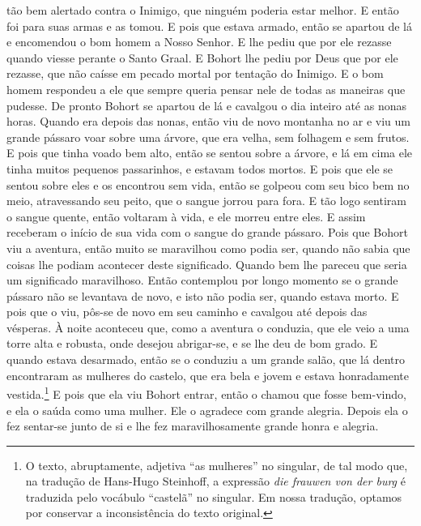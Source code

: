 tão bem alertado contra o Inimigo, que ninguém poderia estar melhor. E então
foi para suas armas e as tomou. E pois que estava armado, então se apartou de
lá e encomendou o bom homem a Nosso Senhor. E lhe pediu que por ele rezasse
quando viesse perante o Santo Graal. E Bohort lhe pediu por Deus que por ele
rezasse, que não caísse em pecado mortal por tentação do Inimigo. E o bom homem
respondeu a ele que sempre queria pensar nele de todas as maneiras que pudesse.
De pronto Bohort se apartou de lá e cavalgou o dia inteiro até as nonas horas.
Quando era depois das nonas, então viu de novo montanha no ar e viu um grande
pássaro voar sobre uma árvore, que era velha, sem folhagem e sem frutos. E pois
que tinha voado bem alto, então se sentou sobre a árvore, e lá em cima ele
tinha muitos pequenos passarinhos, e estavam todos mortos. E pois que ele se
sentou sobre eles e os encontrou sem vida, então se golpeou com seu bico bem no
meio, atravessando seu peito, que o sangue jorrou para fora. E tão logo
sentiram o sangue quente, então voltaram à vida, e ele morreu entre eles. E
assim receberam o início de sua vida com o sangue do grande pássaro.
Pois que Bohort viu a aventura, então muito se maravilhou como podia ser,
quando não sabia que coisas lhe podiam acontecer deste significado. Quando bem
lhe pareceu que seria um significado maravilhoso. Então contemplou por longo
momento se o grande pássaro não se levantava de novo, e isto não podia ser,
quando estava morto. E pois que o viu, pôs-se de novo em seu caminho e cavalgou
até depois das vésperas. À noite aconteceu que, como a aventura o conduzia, que
ele veio a uma torre alta e robusta, onde desejou abrigar-se, e se lhe deu de
bom grado. E quando estava desarmado, então se o conduziu a um grande salão,
que lá dentro encontraram as mulheres do castelo, que era bela e jovem e estava
honradamente vestida.\footnote{ O texto, abruptamente, adjetiva
“as mulheres” no singular, de tal modo que, na tradução de Hans-Hugo Steinhoff,
a expressão \textit{die frauwen von der burg}  é
traduzida pelo vocábulo “castelã” no singular. Em nossa
tradução, optamos por conservar a inconsistência do texto original.} E
pois que ela viu Bohort entrar, então o chamou que fosse bem-vindo, e ela o
saúda como uma mulher. Ele o agradece com grande alegria. Depois ela o fez
sentar-se junto de si e lhe fez maravilhosamente grande honra e alegria.

